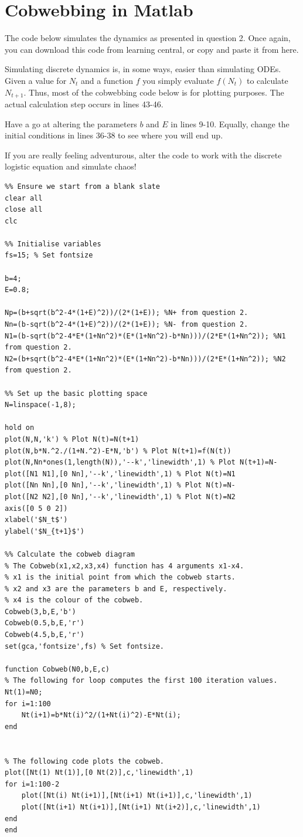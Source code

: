 \documentclass[10pt]{article}
\begin{document}
\section{Cobwebbing in Matlab}
The code below simulates the dynamics as presented in question 2. Once again, you can download this code from learning central, or copy and paste it from here.


Simulating discrete dynamics is, in some ways, easier than simulating ODEs. Given a value for $N_t$ and a function $f$ you simply evaluate $f(N_t)$ to calculate $N_{t+1}$. Thus, most of the cobwebbing code below is for plotting purposes. The actual calculation step occurs in lines 43-46.

Have a go at altering the parameters $b$ and $E$ in lines 9-10. Equally, change the initial conditions in lines 36-38 to see where you will end up.

If you are really feeling adventurous, alter the code to work with the discrete logistic equation and simulate chaos!
\lstset{numbers=none}
\begin{lstlisting}
%% Ensure we start from a blank slate
clear all
close all
clc

%% Initialise variables
fs=15; % Set fontsize

b=4;
E=0.8;

Np=(b+sqrt(b^2-4*(1+E)^2))/(2*(1+E)); %N+ from question 2.
Nn=(b-sqrt(b^2-4*(1+E)^2))/(2*(1+E)); %N- from question 2.
N1=(b-sqrt(b^2-4*E*(1+Nn^2)*(E*(1+Nn^2)-b*Nn)))/(2*E*(1+Nn^2)); %N1 from question 2.
N2=(b+sqrt(b^2-4*E*(1+Nn^2)*(E*(1+Nn^2)-b*Nn)))/(2*E*(1+Nn^2)); %N2 from question 2.

%% Set up the basic plotting space
N=linspace(-1,8);

hold on
plot(N,N,'k') % Plot N(t)=N(t+1)
plot(N,b*N.^2./(1+N.^2)-E*N,'b') % Plot N(t+1)=f(N(t))
plot(N,Nn*ones(1,length(N)),'--k','linewidth',1) % Plot N(t+1)=N-
plot([N1 N1],[0 Nn],'--k','linewidth',1) % Plot N(t)=N1
plot([Nn Nn],[0 Nn],'--k','linewidth',1) % Plot N(t)=N-
plot([N2 N2],[0 Nn],'--k','linewidth',1) % Plot N(t)=N2
axis([0 5 0 2])
xlabel('$N_t$')
ylabel('$N_{t+1}$')

%% Calculate the cobweb diagram
% The Cobweb(x1,x2,x3,x4) function has 4 arguments x1-x4.
% x1 is the initial point from which the cobweb starts.
% x2 and x3 are the parameters b and E, respectively.
% x4 is the colour of the cobweb.
Cobweb(3,b,E,'b')
Cobweb(0.5,b,E,'r')
Cobweb(4.5,b,E,'r')
set(gca,'fontsize',fs) % Set fontsize.

function Cobweb(N0,b,E,c)
% The following for loop computes the first 100 iteration values.
Nt(1)=N0;
for i=1:100
    Nt(i+1)=b*Nt(i)^2/(1+Nt(i)^2)-E*Nt(i);
end


% The following code plots the cobweb.
plot([Nt(1) Nt(1)],[0 Nt(2)],c,'linewidth',1)
for i=1:100-2
    plot([Nt(i) Nt(i+1)],[Nt(i+1) Nt(i+1)],c,'linewidth',1)
    plot([Nt(i+1) Nt(i+1)],[Nt(i+1) Nt(i+2)],c,'linewidth',1)
end
end
\end{lstlisting}
\end{document}
